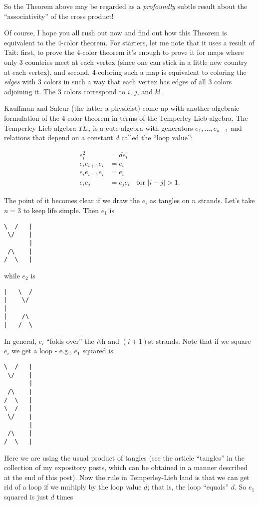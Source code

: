 \documentclass{article}
\begin{document}
So the Theorem above may be regarded as a \emph{profoundly} subtle
result about the ``associativity'' of the cross product!

Of course, I hope you all rush out now and find out how this Theorem is
equivalent to the 4-color theorem. For starters, let me note that it
uses a result of Tait: first, to prove the 4-color theorem it's enough
to prove it for maps where only 3 countries meet at each vertex (since
one can stick in a little new country at each vertex), and second,
4-coloring such a map is equivalent to coloring the \emph{edges} with 3
colors in such a way that each vertex has edges of all 3 colors
adjoining it. The 3 colors correspond to \(i\), \(j\), and \(k\)!

Kauffman and Saleur (the latter a physicist) come up with another
algebraic formulation of the 4-color theorem in terms of the
Temperley-Lieb algebra. The Temperley-Lieb algebra \(TL_n\) is a cute
algebra with generators \(e_1, \ldots, e_{n-1}\) and relations that
depend on a constant \(d\) called the ``loop value'':

\[\begin{aligned}e_i^2 &= de_i \\ e_i e_{i+1} e_i &= e_i \\ e_i e_{i-1} e_i &= e_i \\ e_i e_j &= e_j e_i \quad\text{for } |i-j| > 1.\end{aligned}\]

The point of it becomes clear if we draw the \(e_i\) as tangles on \(n\)
strands. Let's take \(n = 3\) to keep life simple. Then \(e_1\) is

\begin{verbatim}
\  /   |
 \/    |
       |
 /\    |
/  \   |
\end{verbatim}

while \(e_2\) is

\begin{verbatim}
|   \  /  
|    \/   
|      
|    /\   
|   /  \  
\end{verbatim}

In general, \(e_i\) ``folds over'' the \(i\)th and \((i+1)\)st strands.
Note that if we square \(e_i\) we get a loop - e.g., \(e_1\) squared is

\begin{verbatim}
\  /   |
 \/    |
       |
 /\    |
/  \   |
\  /   |
 \/    |
       |
 /\    |
/  \   |
\end{verbatim}

Here we are using the usual product of tangles (see the article
``tangles'' in the collection of my expository posts, which can be
obtained in a manner described at the end of this post). Now the rule in
Temperley-Lieb land is that we can get rid of a loop if we multiply by
the loop value \(d\); that is, the loop ``equals'' \(d\). So \(e_1\)
squared is just \(d\) times
\end{document}
